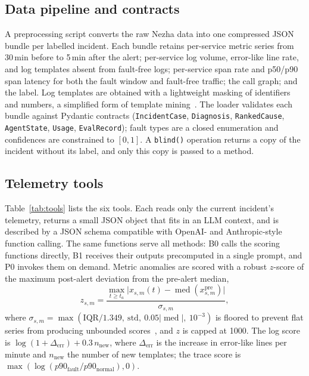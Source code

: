 \documentclass[conference]{IEEEtran}
\begin{document}
\subsection{Data pipeline and contracts}
A preprocessing script converts the raw Nezha data into one compressed JSON bundle per labelled incident. Each bundle retains per-service metric series from 30\,min before to 5\,min after the alert; per-service log volume, error-like line rate, and log templates absent from fault-free logs; per-service span rate and p50/p90 span latency for both the fault window and fault-free traffic; the call graph; and the label. Log templates are obtained with a lightweight masking of identifiers and numbers, a simplified form of template mining~\cite{he2017drain}. The loader validates each bundle against Pydantic contracts (\texttt{IncidentCase}, \texttt{Diagnosis}, \texttt{RankedCause}, \texttt{AgentState}, \texttt{Usage}, \texttt{EvalRecord}); fault types are a closed enumeration and confidences are constrained to $[0,1]$. A \texttt{blind()} operation returns a copy of the incident without its label, and only this copy is passed to a method.

\subsection{Telemetry tools}
Table~\ref{tab:tools} lists the six tools. Each reads only the current incident's telemetry, returns a small JSON object that fits in an LLM context, and is described by a JSON schema compatible with OpenAI- and Anthropic-style function calling. The same functions serve all methods: B0 calls the scoring functions directly, B1 receives their outputs precomputed in a single prompt, and P0 invokes them on demand. Metric anomalies are scored with a robust $z$-score of the maximum post-alert deviation from the pre-alert median,
\begin{equation}
z_{s,m}=\frac{\max_{t\ge t_a}\lvert x_{s,m}(t)-\operatorname{med}(x^{\text{pre}}_{s,m})\rvert}{\sigma_{s,m}},
\label{eq:z}
\end{equation}
where $\sigma_{s,m}=\max(\mathrm{IQR}/1.349,\ \mathrm{std},\ 0.05\lvert\operatorname{med}\rvert,\ 10^{-3})$ is floored to prevent flat series from producing unbounded scores~\cite{leys2013mad}, and $z$ is capped at 1000. The log score is $\log(1+\Delta_{\text{err}})+0.3\,n_{\text{new}}$, where $\Delta_{\text{err}}$ is the increase in error-like lines per minute and $n_{\text{new}}$ the number of new templates; the trace score is $\max(\log(p90_{\text{fault}}/p90_{\text{normal}}),0)$.
\end{document}
